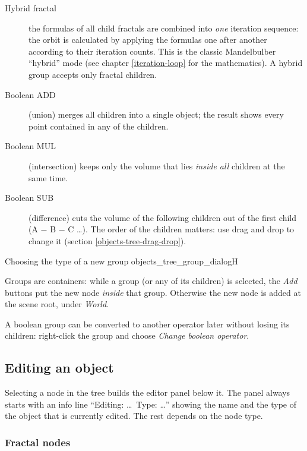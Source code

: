 \begin{description}
	\item[Hybrid fractal] the formulas of all child fractals are combined into \emph{one} iteration
	sequence: the orbit is calculated by applying the formulas one after another according to their
	iteration counts. This is the classic Mandelbulber ``hybrid'' mode (see chapter
	\ref{iteration-loop} for the mathematics). A hybrid group accepts only fractal children.
	\item[Boolean ADD] (union) merges all children into a single object; the result shows every
	point contained in any of the children.
	\item[Boolean MUL] (intersection) keeps only the volume that lies \emph{inside all} children at
	the same time.
	\item[Boolean SUB] (difference) cuts the volume of the following children out of the first
	child (A $-$ B $-$ C \ldots). The order of the children matters: use drag and drop to change
	it (section \ref{objects-tree-drag-drop}).
\end{description}

{Choosing the type of a new group}
{objects_tree_group_dialog}{H}

Groups are containers: while a group (or any of its children) is selected, the \emph{Add} buttons
put the new node \emph{inside} that group. Otherwise the new node is added at the scene root, under
\emph{World}.

A boolean group can be converted to another operator later without losing its children: right-click
the group and choose \emph{Change boolean operator}.

\subsection{Editing an object}\label{objects-tree-editor}

Selecting a node in the tree builds the editor panel below it. The panel always starts with an
info line ``Editing: \ldots\ Type: \ldots'' showing the name and the type of the object that is
currently edited. The rest depends on the node type.

\subsubsection{Fractal nodes}


